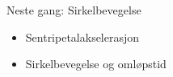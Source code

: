 \documentclass[aspectratio=169, 12pt]{beamer}
\begin{document}
\begin{frame}
\begin{center}
  \Huge{Neste gang: Sirkelbevegelse}
  \begin{itemize}
    \item Sentripetalakselerasjon
    \item Sirkelbevegelse og omløpstid
  \end{itemize}
\end{center}
\end{frame}
\end{document}
